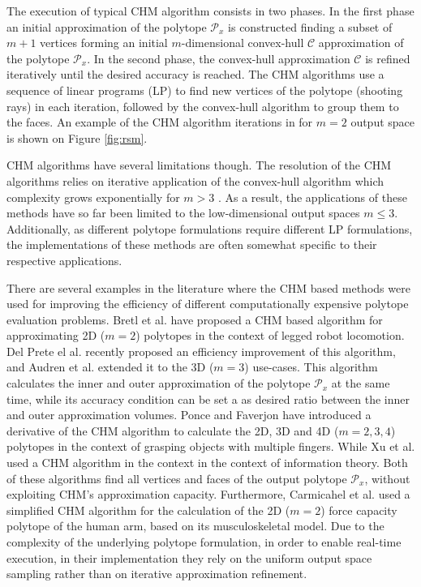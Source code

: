The execution of typical CHM algorithm consists in two phases. In the first phase an initial approximation of the polytope $\mathcal{P}_x$ is constructed finding a subset of $m+1$ vertices forming an initial $m$-dimensional convex-hull $\mathcal{C}$ approximation of the polytope $\mathcal{P}_x$. In the second phase, the convex-hull approximation $\mathcal{C}$ is refined iteratively until the desired accuracy is reached. The CHM algorithms use a sequence of linear programs (LP) to find new vertices of the polytope (shooting rays) in each iteration, followed by the convex-hull algorithm to group them to the faces. An example of the CHM algorithm iterations in for $m=2$ output space is shown on Figure \ref{fig:rsm}.   

CHM algorithms have several limitations though. The resolution of the CHM algorithms relies on iterative application of the convex-hull algorithm which complexity grows exponentially for $m > 3$ \cite{Barber1996}. As a result, the applications of these methods have so far been limited to the low-dimensional output spaces $m\leq3$. Additionally, as different polytope formulations require different LP formulations, the implementations of these methods are often somewhat specific to their respective applications. 

There are several examples in the literature where the CHM based methods were used for improving the efficiency of different computationally expensive polytope evaluation problems. Bretl et al. \cite{Bretl2008} have proposed a CHM based algorithm for approximating 2D ($m\!=\!2$) polytopes in the context of legged robot locomotion. Del Prete el al. \cite{DelPrete2016Fast} recently proposed an efficiency improvement of this algorithm, and Audren et al. \cite{Herve2018} extended it to the 3D ($m\!=\!3$) use-cases. This algorithm calculates the inner and outer approximation of the polytope $\mathcal{P}_x$ at the same time, while its accuracy condition can be set a as desired ratio between the inner and outer approximation volumes. Ponce and Faverjon \cite{Ponce1995} have introduced a derivative of the CHM algorithm to calculate the 2D, 3D and 4D ($m\!=\!2,3,4$) polytopes in the context of grasping objects with multiple fingers. While Xu et al. \cite{Xu2008projection} used a CHM algorithm in the context in the context of information theory. Both of these algorithms find all vertices and faces of the output polytope $\mathcal{P}_x$, without exploiting CHM's approximation capacity.
Furthermore, Carmicahel et al. \cite{carmichael2011Towards, carmichael_estimating_2013} used a simplified CHM algorithm for the calculation of the 2D ($m\!=\!2$) force capacity polytope of the human arm, based on its musculoskeletal model. Due to the complexity of the underlying polytope formulation, in order to enable real-time execution, in their implementation they rely on the uniform output space sampling rather than on iterative approximation refinement. 

